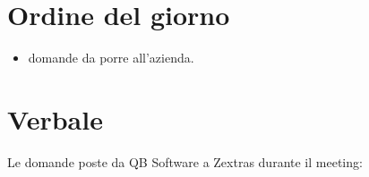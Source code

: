 \documentclass[12pt]{article}
\begin{document}
    \section{Ordine del giorno}
    \begin{itemize}
    	\item domande da porre all'azienda.
    \end{itemize}
    \clearpage
    
    \section{Verbale}
    Le domande poste da QB Software a Zextras durante il meeting:
    
    \newcommand{\answer}{\item[\textbf{A:}]}
    
\end{document}
